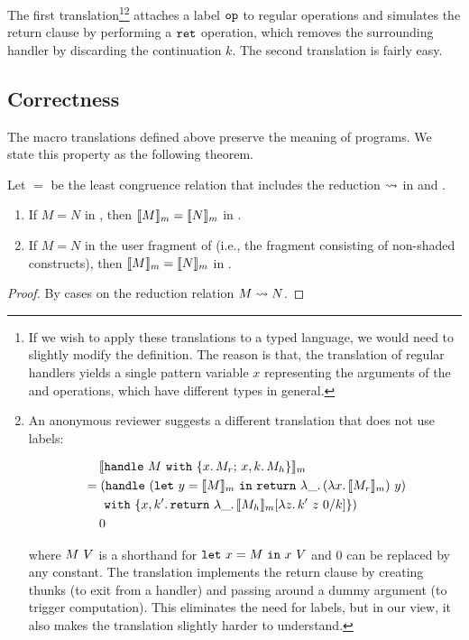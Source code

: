 \noindent The first translation\footnote{
If we wish to apply these translations to a typed language, we would need to 
slightly modify the definition.
The reason is that, the translation of regular handlers yields a single 
pattern variable $x$ representing the arguments of the \rettt and \optt 
operations, which have different types in general.
}\footnote{An anonymous reviewer suggests a different translation that does 
not use labels:

\vspace{-2mm}

\begin{align*}
&\hspace{4.3mm} \macro{\handle{M}{x}{M_r}{x}{k}{M_h}} \\
&= (\handlett \ (\letin{y}{\macro{M}}{\ret{\abs{\_}{\app{(\abs{x}{\macro{M_r}})}{y}}}}) \\
&\hspace{5.7mm}  \withtt \ \{ x, \kpr. \, \ret{\abs{\_}{\subst{\macro{M_h}}{k}{\abs{z}{\apptwo{\kpr}{z}{0}}}}} \}) \\
&\hspace{4.3mm} 0
\end{align*}

\noindent where $M \ V$ is a shorthand for $\texttt{let} \ x = M \ \texttt{in} \ x \ V$
and $0$ can be replaced by any constant.
The translation implements the return clause by creating thunks (to exit from 
a handler) and passing around a dummy argument (to trigger computation).
This eliminates the need for labels, but in our view, it also makes the 
translation slightly harder to understand.
} attaches a label $\texttt{op}$ to regular operations
and simulates the return clause by performing a $\texttt{ret}$ operation, which
removes the surrounding handler by discarding the continuation $k$.
The second translation is fairly easy.


\subsection{Correctness}
\label{sec:return:correct}

The macro translations defined above preserve the meaning of programs.
We state this property as the following theorem.

\begin{theorem}
\label{thm:correctmacro}
Let $=$ be the least congruence relation that includes the reduction
$\leadsto$ in \lambdah and \lambdahn.

\begin{enumerate}
\item If $M = N$ in \lambdah, then $\llbracket M \rrbracket_m = \llbracket N \rrbracket_m$ in \lambdahn.

\item If $M = N$ in the user fragment of \lambdahn (i.e., the fragment
  consisting of non-shaded constructs), then $\llbracket M \rrbracket_m = \llbracket N \rrbracket_m$ in
  \lambdah.
\end{enumerate}
\end{theorem}

\begin{proof}
By cases on the reduction relation $M \leadsto N$.
\end{proof}
